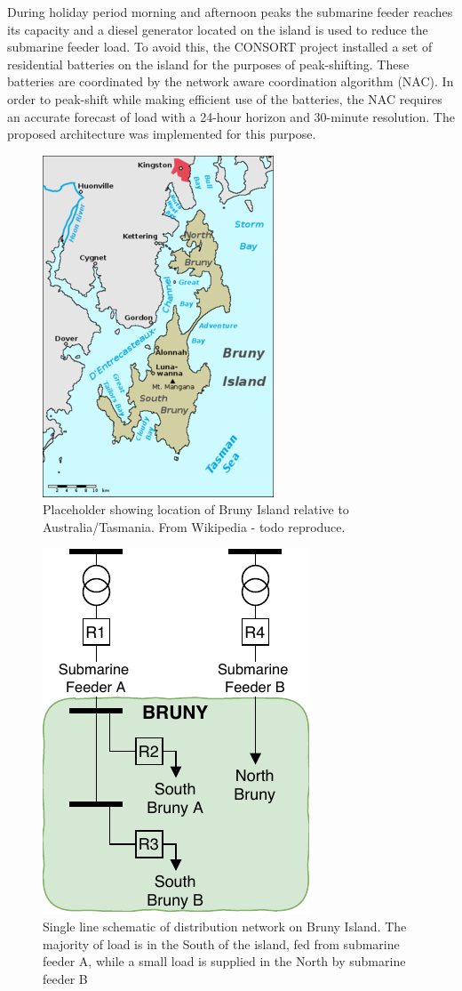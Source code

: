 \documentclass[conference]{IEEEtran}
\begin{document}
During holiday period morning and afternoon peaks the submarine feeder reaches its capacity and a diesel generator located on the island is used to reduce the submarine feeder load.
To avoid this, the CONSORT project installed a set of residential batteries on the island for the purposes of peak-shifting.
These batteries are coordinated by the network aware coordination algorithm (NAC).
In order to peak-shift while making efficient use of the batteries, the NAC requires an accurate forecast of load with a 24-hour horizon and 30-minute resolution.
The proposed architecture was implemented for this purpose.



\begin{figure}[htbp]
	\centerline{\includegraphics[width=.35\textwidth]{images/bruny_island_map.png}}
	\caption{Placeholder showing location of Bruny Island relative to Australia/Tasmania. From Wikipedia - todo reproduce.}
	\label{fig:bruny_map}
\end{figure}

\begin{figure}[htbp]
	\centerline{\includegraphics[width=.2\textwidth]{images/bruny_single_line.pdf}}
	\caption{Single line schematic of distribution network on Bruny Island.
			 The majority of load is in the South of the island, fed from submarine feeder A, while a small load is supplied in the North by submarine feeder B}
	\label{fig:bruny_network}
\end{figure}
\end{document}
